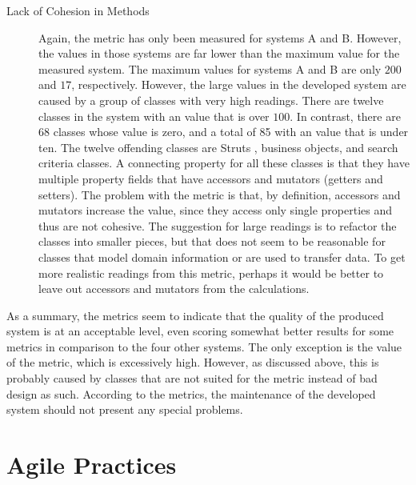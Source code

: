 \begin{description}
\item[Lack of Cohesion in Methods] Again, the  metric has 
only been measured for systems A and B. However, the values in those 
systems are far lower than the maximum value for the measured system. 
The maximum values for systems A and B are only $200$ and $17$, 
respectively. However, the large values in the developed system are 
caused by a group of classes with very high  readings. 
There are twelve classes in the system with an  value 
that is over $100$. In contrast, there are 68 classes whose 
 value is zero, and a total of 85 with an  
value that is under ten. The twelve offending classes are Struts 
, business objects, and search criteria classes. A 
connecting property for all these classes is that they have multiple 
property fields that have accessors and mutators (getters and 
setters). The problem with the  metric is that, by 
definition, accessors and mutators increase the  value, 
since they access only single properties and thus are not cohesive. 
The suggestion for large  readings is to refactor the 
classes into smaller pieces, but that does not seem to be reasonable 
for classes that model domain information or are used to transfer 
data. To get more realistic readings from this metric, perhaps it 
would be better to leave out accessors and mutators from the 
calculations.

\end{description}

As a summary, the metrics seem to indicate that the quality of the 
produced system is at an acceptable level, even scoring somewhat 
better results for some metrics in comparison to the four other 
systems. The only exception is the value of the  metric, 
which is excessively high. However, as discussed above, this is 
probably caused by classes that are not suited for the metric instead 
of bad design as such. According to the metrics, the maintenance of 
the developed system should not present any special problems.


\section{Agile Practices}
\label{toc:result:agile}

